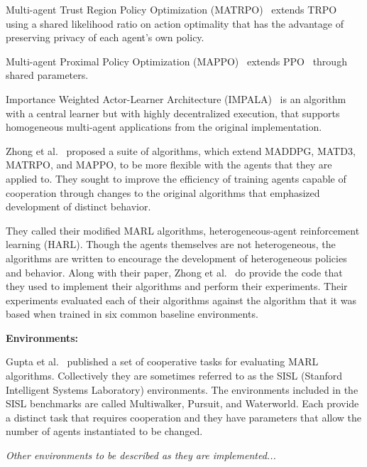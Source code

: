 Multi-agent Trust Region Policy Optimization (MATRPO)~\cite{li2023c}
extends TRPO~\cite{schulman2017} using a shared likelihood
ratio on action optimality that has the advantage of preserving
privacy of each agent's own policy.

Multi-agent Proximal Policy Optimization (MAPPO)~\cite{yu2022} extends
PPO~\cite{schulman2017a} through shared parameters.

Importance Weighted Actor-Learner Architecture (IMPALA)~\cite{espeholt2018}
is an algorithm with a central learner but with highly decentralized 
execution, that supports homogeneous multi-agent applications from the
original implementation.

Zhong et al.~\cite{zhong2024} proposed a suite of algorithms,
which extend MADDPG, MATD3, MATRPO, and MAPPO,
to be more flexible with the agents that they are applied to.
They sought to improve the efficiency of training agents capable
of cooperation through changes to the original algorithms that 
emphasized development of distinct behavior.

They called their modified MARL algorithms, heterogeneous-agent 
reinforcement learning (HARL).
Though the agents themselves are not heterogeneous,
the algorithms are written to encourage the development of
heterogeneous policies and behavior.
Along with their paper, Zhong et al.~\cite{zhong2024} do provide the code 
that they used to implement their algorithms and perform their experiments.
Their experiments evaluated each of their algorithms against the algorithm 
that it was based when trained in six common baseline environments.


\textbf{Environments:}

Gupta et al.~\cite{gupta2017cooperative} published a set of cooperative 
tasks for evaluating MARL algorithms. Collectively they are sometimes
referred to as the SISL (Stanford Intelligent Systems Laboratory)
environments. The environments included in the SISL benchmarks
are called Multiwalker, Pursuit, and Waterworld.
Each provide a distinct task that requires cooperation and they
have parameters that allow the number of agents instantiated to be changed. 

\phantom{\hfil} %

\emph{Other environments to be described as they are implemented...}


